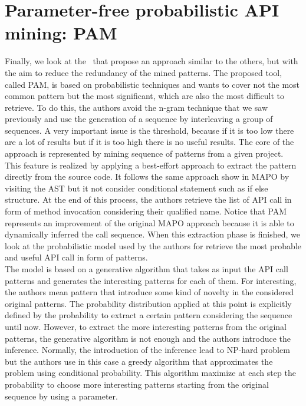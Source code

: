 \section{Parameter-free probabilistic API mining: PAM}
Finally, we look at the~\cite{fowkes_parameter-free_2016} that propose an approach similar to the others, but with the aim to reduce the redundancy of the mined patterns. The proposed tool, called PAM, is based on probabilistic techniques and wants to cover not the most common pattern but the most significant, which are also the most difficult to retrieve. To do this, the authors avoid the n-gram technique that we saw previously and use the generation of a sequence by interleaving a group of sequences. A very important issue is the threshold, because if it is too low there are a lot of results but if it is too high there is no useful results. The core of the approach is represented by mining sequence of patterns from a given project. \\
This feature is realized by applying a best-effort approach to extract the pattern directly from the source code. It follows the same approach show in MAPO by visiting the AST but it not consider conditional statement such as if else structure. At the end of this process, the authors retrieve the list of API call in form of method invocation considering their qualified name. Notice that PAM represents an improvement of the original MAPO approach because it is able to dynamically inferred the call sequence. When this extraction phase is finished, we look at the probabilistic model used by the authors for retrieve the most probable and useful API call in form of patterns. \\
The model is based on a generative algorithm that takes as input the API call patterns and generates the interesting patterns for each of them. For interesting, the authors mean pattern that introduce some kind of novelty in the considered original patterns. The probability distribution applied at this point is explicitly defined by the probability to extract a certain pattern considering the sequence until now. However, to extract the more interesting patterns from the original patterns, the generative algorithm is not enough and the authors introduce the inference. Normally, the introduction of the inference lead to NP-hard problem but the authors use in this case a greedy algorithm that approximates the problem using conditional probability. This algorithm maximize at each step the probability to choose more interesting patterns starting from the original sequence by using a parameter. \newline
